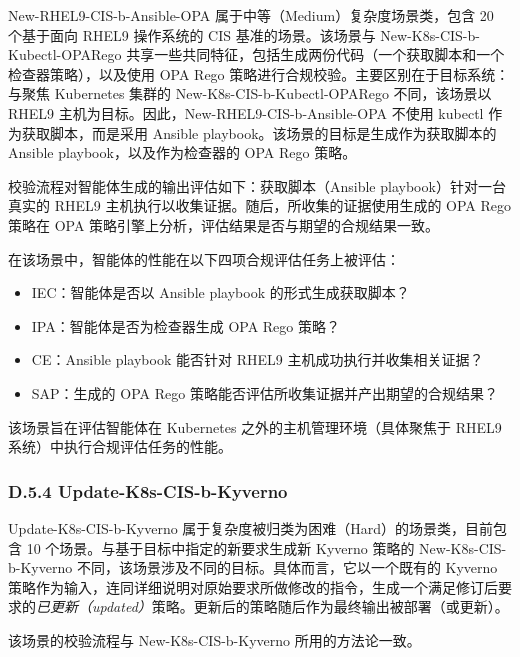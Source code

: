 New-RHEL9-CIS-b-Ansible-OPA 属于中等（Medium）复杂度场景类，包含 20 个基于面向 RHEL9 操作系统的 CIS 基准的场景。该场景与 New-K8s-CIS-b-Kubectl-OPARego 共享一些共同特征，包括生成两份代码（一个获取脚本和一个检查器策略），以及使用 OPA Rego 策略进行合规校验。主要区别在于目标系统：与聚焦 Kubernetes 集群的 New-K8s-CIS-b-Kubectl-OPARego 不同，该场景以 RHEL9 主机为目标。因此，New-RHEL9-CIS-b-Ansible-OPA 不使用 kubectl 作为获取脚本，而是采用 Ansible playbook。该场景的目标是生成作为获取脚本的 Ansible playbook，以及作为检查器的 OPA Rego 策略。

校验流程对智能体生成的输出评估如下：获取脚本（Ansible playbook）针对一台真实的 RHEL9 主机执行以收集证据。随后，所收集的证据使用生成的 OPA Rego 策略在 OPA 策略引擎上分析，评估结果是否与期望的合规结果一致。

在该场景中，智能体的性能在以下四项合规评估任务上被评估：

\begin{itemize}
\item IEC：智能体是否以 Ansible playbook 的形式生成获取脚本？
\item IPA：智能体是否为检查器生成 OPA Rego 策略？
\item CE：Ansible playbook 能否针对 RHEL9 主机成功执行并收集相关证据？
\item SAP：生成的 OPA Rego 策略能否评估所收集证据并产出期望的合规结果？
\end{itemize}

该场景旨在评估智能体在 Kubernetes 之外的主机管理环境（具体聚焦于 RHEL9 系统）中执行合规评估任务的性能。

\subsubsection{D.5.4 Update-K8s-CIS-b-Kyverno}

Update-K8s-CIS-b-Kyverno 属于复杂度被归类为困难（Hard）的场景类，目前包含 10 个场景。与基于目标中指定的新要求生成新 Kyverno 策略的 New-K8s-CIS-b-Kyverno 不同，该场景涉及不同的目标。具体而言，它以一个既有的 Kyverno 策略作为输入，连同详细说明对原始要求所做修改的指令，生成一个满足修订后要求的\textit{已更新（updated）}策略。更新后的策略随后作为最终输出被部署（或更新）。

该场景的校验流程与 New-K8s-CIS-b-Kyverno 所用的方法论一致。

